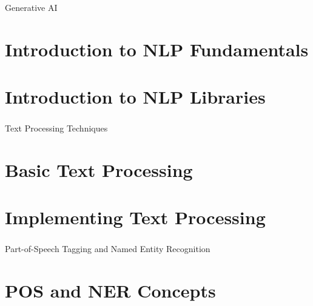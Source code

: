 \begin{frame}[fragile]\frametitle{}
\begin{center}
{\Large Generative AI }
\end{center}
\end{frame}

\section[Day 1 Theory]{Introduction to NLP Fundamentals}




\section[Day 1 Lab]{Introduction to NLP Libraries}




\begin{frame}[fragile]\frametitle{}
\begin{center}
{\Large Text Processing Techniques}
\end{center}
\end{frame}

\section[Day 2 Theory]{Basic Text Processing}




\section[Day 2 Lab]{Implementing Text Processing}



\begin{frame}[fragile]\frametitle{}
\begin{center}
{\Large Part-of-Speech Tagging and Named Entity Recognition}
\end{center}
\end{frame}

\section[Day 3 Theory]{POS and NER Concepts}



